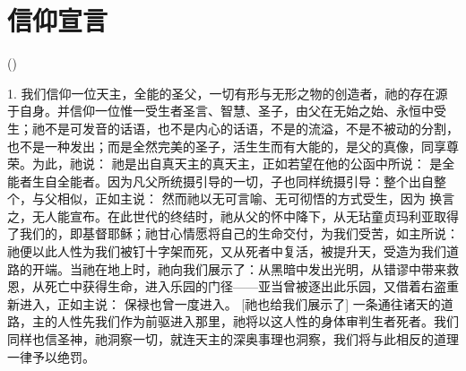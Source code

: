 
\chapter{信仰宣言}


()\par

1. 我们信仰一位天主，全能的圣父，一切有形与无形之物的创造者，祂的存在源于自身。并信仰一位惟一受生者圣言、智慧、圣子，由父在无始之始、永恒中受生；祂不是可发音的话语，也不是内心的话语，不是的流溢，不是不被动的分割，也不是一种发出；而是全然完美的圣子，活生生而有大能的，是父的真像，同享尊荣。为此，祂说： 祂是出自真天主的真天主，正如若望在他的公函中所说： 是全能者生自全能者。因为凡父所统摄引导的一切，子也同样统摄引导：整个出自整个，与父相似，正如主说： 然而祂以无可言喻、无可彻悟的方式受生，因为 换言之，无人能宣布。在此世代的终结时，祂从父的怀中降下，从无玷童贞玛利亚取得了我们的，即基督耶稣；祂甘心情愿将自己的生命交付，为我们受苦，如主所说： 祂便以此人性为我们被钉十字架而死，又从死者中复活，被提升天，受造为我们道路的开端。当祂在地上时，祂向我们展示了：从黑暗中发出光明，从错谬中带来救恩，从死亡中获得生命，进入乐园的门径——亚当曾被逐出此乐园，又借着右盗重新进入，正如主说： 保禄也曾一度进入。 [祂也给我们展示了] 一条通往诸天的道路，主的人性先我们作为前驱进入那里，祂将以这人性的身体审判生者死者。我们同样也信圣神，祂洞察一切，就连天主的深奥事理也洞察，我们将与此相反的道理一律予以绝罚。\par

